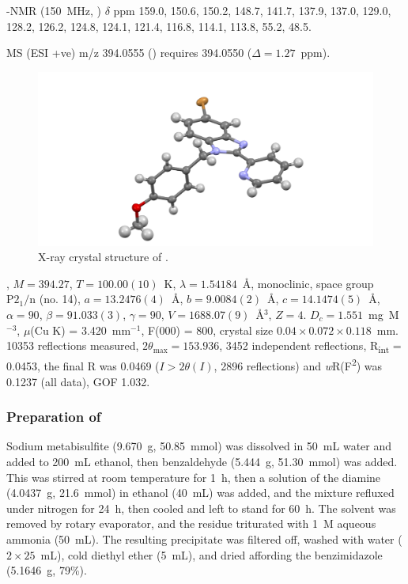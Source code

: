 \begin{refsection}
\begin{enumerate}
    -NMR (150~MHz, ) $\delta$ ppm 159.0, 150.6, 150.2, 148.7, 141.7, 137.9, 137.0, 129.0, 128.2, 126.2, 124.8, 124.1, 121.4, 116.8, 114.1, 113.8, 55.2, 48.5.
    
\end{enumerate}

MS (ESI +ve) m/z 394.0555 ()  requires 394.0550 ($\Delta=1.27$~ppm).

\begin{figure}
    \includegraphics[width=0.8\linewidth]{Figures/rhs-bromo-2py-pmb-xtal.pdf}
    \caption{X-ray crystal structure of .}
\end{figure}

, $M=394.27$, $T=100.00(10)$~K, $\lambda=1.54184$~\AA, monoclinic, space group $\text{P}2_1/\text{n}$ (no. 14), $a = 13.2476(4)$~\AA, $b = 9.0084(2)$~\AA, $c = 14.1474(5)$~\AA, $\alpha = 90$\degree, $\beta = 91.033(3)$\degree, $\gamma = 90$\degree, $V = 1688.07(9)$~\AA$^{3}$, $Z = 4$. $D_{c}= 1.551$~mg~M$^{-3}$, $\mu$(Cu K\a) = 3.420~mm$^{-1}$, F(000) = 800, crystal size $0.04 \times 0.072 \times 0.118$~mm. 10353 reflections measured, $2\theta_{\max}=153.936$\degree, 3452 independent reflections, R\textsubscript{int} = 0.0453, the final R was 0.0469 ($I > 2\theta(I)$, 2896 reflections) and \emph{w}R(F\textsuperscript{2}) was 0.1237 (all data), GOF 1.032. 

\subsubsection{Preparation of }
Sodium metabisulfite (9.670~g, 50.85~mmol) was dissolved in 50~mL water and added to 200~mL ethanol, then benzaldehyde (5.444~g, 51.30~mmol) was added.
This was stirred at room temperature for 1~h, then a solution of the diamine  (4.0437~g, 21.6~mmol) in ethanol (40~mL) was added, and the mixture refluxed under nitrogen for 24~h, then cooled and left to stand for 60~h.
The solvent was removed by rotary evaporator, and the residue triturated with 1~M aqueous ammonia (50~mL). 
The resulting precipitate was filtered off, washed with water ($2\times25$~mL), cold diethyl ether (5~mL), and dried affording the benzimidazole  (5.1646~g, 79\%).\autocite{Kim2011}


\end{refsection}
